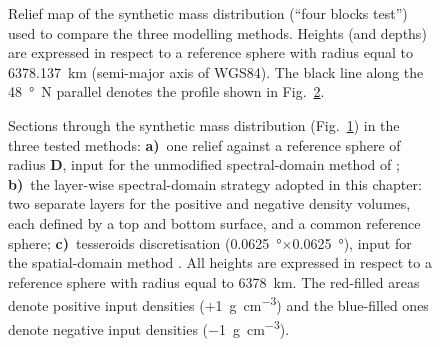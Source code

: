 \begin{subappendices}
\begin{figure} %
    \begin{adjustbox}{center}
    \end{adjustbox}
    \caption[Relief map of the synthetic mass distribution used to compare the three modelling methods.]{
        Relief map of the synthetic mass distribution (``four blocks test'') used to compare the three modelling methods.
        Heights (and depths) are expressed in respect to a reference sphere with radius equal to \SI{6378.137}{\kilo \metre} (semi-major axis of {WGS84}).
        The black line along the \SI{48}{\degree N} parallel denotes the profile shown in Fig.~\ref{fig:SpatSpecComp:4B_sections}.}
    \label{fig:SpatSpecComp:4B_DepthMap}
\end{figure}

\begin{figure} %
    \begin{adjustbox}{center}
    \end{adjustbox}
    \caption[Sections trough the synthetic mass distribution in the three tested modelling methods]{
        Sections through the synthetic mass distribution (Fig.~\ref{fig:SpatSpecComp:4B_DepthMap}) in the three tested methods:
        \textbf{a)}~one relief against a reference sphere of radius $\bm{D}$, input for the unmodified spectral-domain method of \textcite{Wieczorek2007};
        \textbf{b)}~the layer-wise spectral-domain strategy adopted in this chapter: two separate layers for the positive and negative density volumes, each defined by a top and bottom surface, and a common reference sphere;
        \textbf{c)}~tesseroids discretisation (\SI{0.0625}{\degree}$\times$\SI{0.0625}{\degree}), input for the spatial-domain method \parencite{Uieda2016}.
        All heights are expressed in respect to a reference sphere with radius equal to \SI{6378}{\kilo \metre}.
        The red-filled areas denote positive input densities ($+$\SI{1}{\gram \per \cubic \centi \metre}) and the blue-filled ones denote negative input densities (\SI{-1}{\gram \per \cubic \centi \metre}).}
    \label{fig:SpatSpecComp:4B_sections}
\end{figure}


\end{subappendices}
